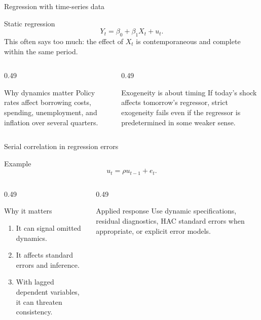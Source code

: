 \documentclass[10pt]{beamer}
\begin{document}
\begin{frame}{Regression with time-series data}
\label{slide:ts_reg}
\small
\begin{block}{Static regression}
\[
Y_t=\beta_0+\beta_1X_t+u_t.
\]
This often says too much: the effect of $X_t$ is contemporaneous and complete within the same period.
\end{block}

\pause
\begin{columns}[T]
\begin{column}{0.49\textwidth}
\begin{exampleblock}{Why dynamics matter}
Policy rates affect borrowing costs, spending, unemployment, and inflation over several quarters.
\end{exampleblock}
\end{column}
\begin{column}{0.49\textwidth}
\begin{alertblock}{Exogeneity is about timing}
If today's shock affects tomorrow's regressor, strict exogeneity fails even if the regressor is predetermined in some weaker sense.
\end{alertblock}
\end{column}
\end{columns}
\end{frame}

\begin{frame}{Serial correlation in regression errors}
\small
\begin{block}{Example}
\[
u_t=\rho u_{t-1}+e_t.
\]
\end{block}

\begin{columns}[T]
\begin{column}{0.49\textwidth}
\begin{alertblock}{Why it matters}
\begin{enumerate}
  \item It can signal omitted dynamics.
  \item It affects standard errors and inference.
  \item With lagged dependent variables, it can threaten consistency.
\end{enumerate}
\end{alertblock}
\end{column}
\begin{column}{0.49\textwidth}
\begin{exampleblock}{Applied response}
Use dynamic specifications, residual diagnostics, HAC standard errors when appropriate, or explicit error models.
\end{exampleblock}
\end{column}
\end{columns}
\end{frame}
\end{document}
